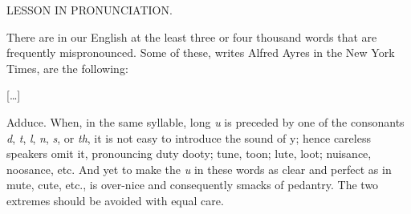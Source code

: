 \begin{ipquote}
\begin{center}
LESSON IN PRONUNCIATION.\\
\end{center}
{There are in our English at the least three or four thousand words that are frequently mispronounced. Some of these, writes Alfred Ayres in the New York Times, are the following:

\centering
{[…]}  

Adduce. When, in the same syllable, long \textit{u} is preceded by one of the consonants \textit{d}, \textit{t}, \textit{l}, \textit{n}, \textit{s}, or \textit{th}, it is not easy to introduce the sound of y; hence careless speakers omit it, pronouncing duty dooty; tune, toon; lute, loot; nuisance, noosance, etc. And yet to make the \textit{u} in these words as clear and perfect as in mute, cute, etc., is over-nice and consequently smacks of pedantry. The two extremes should be avoided with equal care.}
\end{ipquote}

